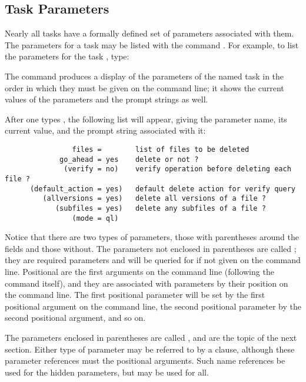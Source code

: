 \subsection{Task Parameters}

\ppind
Nearly all tasks have a formally defined set of parameters associated
with them.  The parameters for a task may be listed with the command
.  For example, to list the parameters for
the task , type:

\begin{quotation}\noindent
{} 
\end{quotation}

\noindent
The  command produces a display of the parameters of the
named task in the order in
which they must be given on the command line; it shows the current values
of the parameters and the prompt strings as well.

After one types , the following list will appear,
giving the parameter name, its
current value, and the prompt string associated with it:

\begin{verbatim}
                files =        list of files to be deleted
             go_ahead = yes    delete or not ?
              (verify = no)    verify operation before deleting each file ?
      (default_action = yes)   default delete action for verify query
         (allversions = yes)   delete all versions of a file ?
            (subfiles = yes)   delete any subfiles of a file ?
                (mode = ql)
\end{verbatim}

Notice that there are two types of parameters, those with 
parentheses around the  fields and those without.
The parameters not enclosed in parentheses are called 
; they are required parameters
and will be queried for if not given on the command line. Positional
 are the first arguments on the command line (following
the command itself), and they are associated with parameters by their position
on the command line. The first positional parameter will be set by the first
positional argument on the command line, the second positional parameter by
the second positional argument, and so on. 

The parameters enclosed in
parentheses are called , and are the topic of
the next section.  Either type of parameter may be referred to by a
 clause, although these parameter references
must  the positional arguments.  Such name references
 be used for the hidden parameters, but may be used for all.

